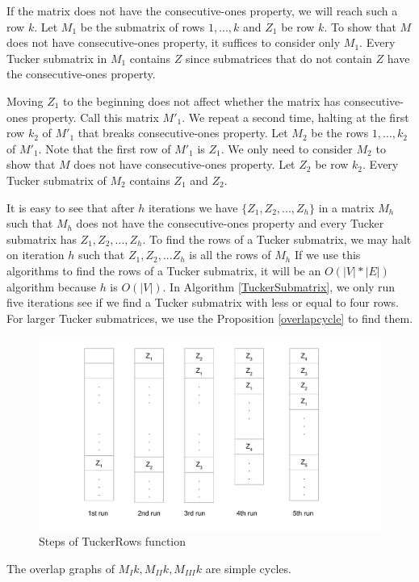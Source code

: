 If the matrix does not have the consecutive-ones property, we will reach such a row $k$. Let $M_{1}$ be the submatrix of rows $1,...,k$ and $Z_1$ be row $k$. To show that $M$ does not have consecutive-ones property, it suffices to consider only $M_{1}$. Every Tucker submatrix in $M_{1}$ contains $Z$ since submatrices that do not contain $Z$ have the consecutive-ones property.

Moving $Z_1$ to the beginning does not affect whether the matrix has consecutive-ones property. Call this matrix $M'_1$. We repeat a second time, halting at the first row $k_2$ of $M'_1$ that breaks consecutive-ones property. Let $M_2$ be the rows $1,...,k_2$ of $M'_1$. Note that the first row of $M'_1$ is $Z_1$. We only need to consider $M_2$ to show that $M$ does not have consecutive-ones property. Let $Z_2$ be row $k_2$. Every Tucker submatrix of $M_2$ contains $Z_1$ and $Z_2$.

It is easy to see that after $h$ iterations we have $\{Z_1,Z_2,...,Z_h\}$ in a matrix $M_h$ such that $M_h$ does not have the consecutive-ones property and every Tucker submatrix has $Z_1,Z_2,...,Z_h$. To find the rows of a Tucker submatrix, we may halt on iteration $h$ such that $Z_1,Z_2,...Z_h$ is all the rows of $M_h$ If we use this algorithms to find the rows of a Tucker submatrix, it will be an $O(|V|*|E|)$ algorithm because $h$ is $O(|V|)$. In Algorithm \ref{TuckerSubmatrix}, we only run five iterations see if we find a Tucker submatrix with less or equal to four rows. For larger Tucker submatrices, we use the Proposition \ref{overlapcycle} to find them.

\begin{figure}[H]
\centering
\includegraphics[width=12cm]{figures/lm_1.pdf}
\caption{Steps of TuckerRows function}
\label{lm_1}
\end{figure}

\begin{proposition}
\label{overlapcycle}
The overlap graphs of $M_I{k},M_{II}{k},M_{III}{k}$ are simple cycles.
\end{proposition}

